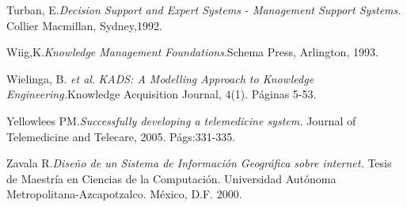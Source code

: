 \begin{thebibliography}{}
 Turban, E.\textit{Decision Support and Expert Systems - Management Support Systems.} Collier Macmillan, Sydney,1992.

 Wiig,K.\textit{Knowledge Management Foundations}.Schema Press, Arlington, 1993. 

 Wielinga, B. \textit{et al}. \textit{KADS: A Modelling Approach to Knowledge Engineering.}Knowledge Acquisition Journal, 4(1). Páginas 5-53.

 Yellowlees PM.\textit{Successfully developing a telemedicine system.} Journal of Telemedicine and Telecare, 2005. Págs:331-335.

 Zavala R.\textit{Diseño de un Sistema de Información Geográfica sobre internet.} Tesis de Maestría en Ciencias de la Computación. Universidad Autónoma Metropolitana-Azcapotzalco. México, D.F. 2000.

\end{thebibliography}
